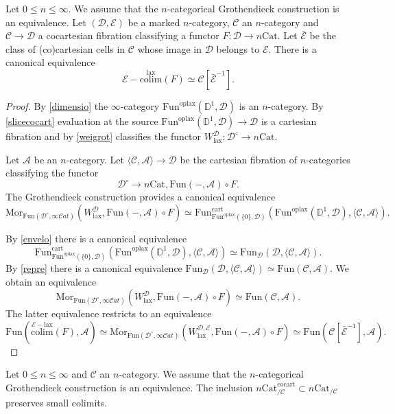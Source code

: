 \documentclass[10pt,oneside]{article}
\numberwithin{equation}{section} %
\numberwithin{figure}{section} %
\theoremstyle{plain}
\theoremstyle{definition}
\newcommand{\bD}{{\mathbb D}}
\newcommand{\mA}{{\mathcal A}}
\newcommand{\mC}{{\mathcal C}}
\newcommand{\mD}{{\mathcal D}}
\newcommand{\mE}{{\mathcal E}}
\newcommand{\W}{W}
\newcommand{\n}{{n}}
\newcommand{\colim}{\mathrm{colim}}
\newcommand{\Cat}{\mathrm{Cat}}
\newcommand{\Fun}{\mathrm{Fun}}
\newcommand{\cocart}{{\mathrm{cocart}}}
\newcommand{\cart}{{\mathrm{cart}}}
\newcommand{\lax}{{\mathrm{lax}}}
\newcommand{\oplax}{{\mathrm{oplax}}}
\newcommand{\Mor}{{\mathrm{Mor}}}
\newcommand{\scat}{\mathcal{C}\mathit{at}}
\begin{document}
\begin{theorem}\label{laxgro}
Let $0 \leq \n \leq \infty.$ 
We assume that the $n$-categorical Grothendieck construction is an equivalence.
Let $(\mD, \mE) $ be a marked $n$-category, $\mC$ an $n$-category and
$\mC \to \mD$ a cocartesian fibration classifying a functor $F: \mD \to n\Cat$. Let $\bar{\mE} $ be the class of (co)cartesian cells in $\mC$ whose image in $\mD$ belongs to $\mE.$
There is a canonical equivalence
$$ \mE-\overset{\lax}{\colim}(F) \simeq \mC[\bar{\mE}^{-1}].$$    
\end{theorem}

\begin{proof}
By \cref{dimensio} the $\infty$-category $\Fun^\oplax(\bD^1,\mD)$ is an $n$-category. By \cref{slicecocart} evaluation at the source $\Fun^\oplax(\bD^1,\mD)\to \mD$ is a cartesian fibration and by \cref{weigrot} classifies the functor $ \W^{\mD}_\lax: \mD^\circ \to n\Cat$.

Let $\mA$ be an $n$-category.
Let $\langle \mC, \mA \rangle \to \mD$ be the cartesian fibration 
of $n$-categories classifying the functor $$\mD^\circ \to n\Cat, \Fun(-,\mA) \circ F.$$
The Grothendieck construction provides a canonical equivalence 
$$ \Mor_{\Fun(\mD^\circ,\infty\scat)}(\W^{\mD}_\lax, \Fun(-,\mA) \circ F)\simeq \Fun^\cart_{\Fun^\oplax(\{0\},\mD)}(\Fun^\oplax(\bD^1,\mD), \langle \mC, \mA \rangle).$$

By \cref{envelo} there is a canonical equivalence 
$$ \Fun^\cart_{\Fun^\oplax(\{0\},\mD)}(\Fun^\oplax(\bD^1,\mD), \langle \mC, \mA \rangle) \simeq \Fun_{\mD}(\mD, \langle \mC, \mA \rangle).$$
By \cref{repre} there is a canonical equivalence
$ \Fun_{\mD}(\mD, \langle \mC, \mA \rangle) \simeq \Fun(\mC,\mA).$
We obtain an equivalence 
$$ \Mor_{\Fun(\mD^\circ,\infty\scat)}(\W^{\mD}_\lax, \Fun(-,\mA) \circ F)\simeq \Fun(\mC,\mA).$$
The latter equivalence restricts to an equivalence 
$$\Fun(\overset{\mE-\lax}{\colim}(F), \mA) \simeq \Mor_{\Fun(\mD^\circ,\infty\scat)}(\W^{\mD, \mE}_\lax, \Fun(-,\mA) \circ F) \simeq \Fun(\mC[\bar{\mE}^{-1}],\mA). $$
\end{proof}

\begin{corollary}\label{cocartcolim}

Let $0 \leq \n \leq \infty$ and $\mC$ an $n$-category.
We assume that the $n$-categorical Grothendieck construction is an equivalence.
The inclusion $n\Cat^\cocart_{/\mC} \subset {n\Cat}_{/\mC}$
preserves small colimits.
    
\end{corollary}
\end{document}

